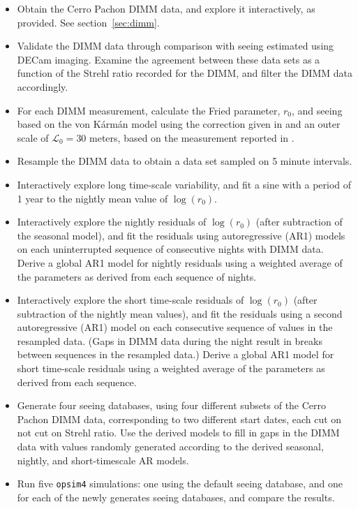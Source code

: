\documentclass[\docopts]{\docclass}
\begin{document}
\begin{itemize}

  \item Obtain the Cerro Pachon DIMM data, and explore it
    interactively, as provided. See section~\ref{sec:dimm}.
  \item Validate the DIMM data through comparison with seeing
    estimated using DECam imaging. Examine the agreement between these
    data sets as a function of the Strehl ratio recorded for the DIMM,
    and filter the DIMM data accordingly.
  \item For each DIMM measurement, calculate the Fried parameter,
    $r_{0}$, and seeing based on the von K\'arm\'an model using the
    correction given in \cite{2002PASP..114.1156T} and an outer scale
    of $\mathcal{L}_{0} = 30$ meters, based on the measurement
    reported in \cite{2000ApOpt..39.5415Z}.
  \item Resample the DIMM data to obtain a data set sampled on 5
    minute intervals.
  \item Interactively explore long time-scale variability, and fit
    a sine with a period of 1 year to the nightly mean value of
    $\log(r_{0})$.
  \item Interactively explore the nightly residuals of $\log(r_{0})$
    (after subtraction of the seasonal model), and fit the residuals
    using autoregressive (AR1) models on each uninterrupted sequence
    of consecutive nights with DIMM data. Derive a global AR1 model
    for nightly residuals using a weighted average of the parameters
    as derived from each sequence of nights.
  \item Interactively explore the short time-scale residuals of
    $\log(r_{0})$ (after subtraction of the nightly mean values), and fit the
    residuals using a second autoregressive (AR1) model on each
    consecutive sequence of values in the resampled data. (Gaps
    in DIMM data during the night result in breaks between sequences
    in the resampled data.) Derive a global AR1 model for short
    time-scale residuals using a weighted average of the parameters as
    derived from each sequence.
  \item Generate four seeing databases, using four different subsets
    of the Cerro Pachon DIMM data, corresponding to two different
    start dates, each cut on not cut on Strehl ratio. Use the derived
    models to fill in gaps in the DIMM data with values randomly
    generated according to the derived seasonal, nightly, and
    short-timescale AR models.
  \item Run five \texttt{opsim4} simulations: one using the default seeing
    database, and one for each of the newly generates seeing
    databases, and compare the results.
\end{itemize}
\end{document}
